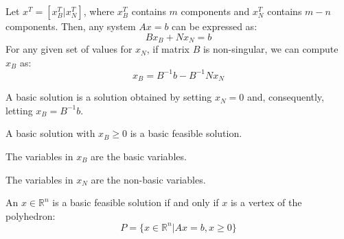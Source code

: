 Let $x^T=\left[x_B^T | x_N^T\right]$, where $x_B^T$ contains  $m$ components and $x_N^T$ contains  $m-n$ components. 
Then, any system $Ax = b$ can be expressed as:
\[Bx_B+Nx_N=b\]
For any given set of values for $x_N$, if matrix  $B$ is non-singular, we can compute $x_B$ as:
\[x_B=B^{-1}b-B^{-1}Nx_N\]
\begin{definition}
    A basic solution is a solution obtained by setting $x_N=0$ and, consequently, letting $x_B=B^{-1}b$.
\end{definition}
\begin{definition}
    A basic solution with $x_B \geq 0$ is a basic feasible solution.
\end{definition}
\begin{definition}
    The variables in $x_B$ are the basic variables.
\end{definition}
\begin{definition}
    The variables in $x_N$ are the non-basic variables.
\end{definition}
\begin{theorem}
    An $x \in \mathbb{R}^n$ is a basic feasible solution if and only if $x$ is a vertex of the polyhedron:
    \[P=\{x \in \mathbb{R}^n|Ax=b,x \geq 0\}\]
\end{theorem}

